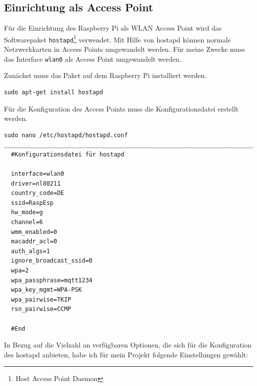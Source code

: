 \documentclass[12pt, letterpaper]{article}
\begin{document}
\subsection{Einrichtung als Access Point}
\par Für die Einrichtung des Raspberry Pi als WLAN Access Point wird das Softwarepaket \texttt{hostapd}\footnote[3]{Host Access Point Daemon} verwendet. Mit Hilfe von hostapd können normale Netzwerkkarten in Access Points umgewandelt werden. Für meine Zwecke muss das Interface \texttt{wlan0} als Access Point umgewandelt werden.
\par Zunächst muss das Paket auf dem Raspberry Pi installiert werden.
\begin{Verbatim}[frame=single]
  sudo apt-get install hostapd
\end{Verbatim}
Für die Konfiguration des Access Points muss die Konfigurationsdatei  erstellt werden. 
\begin{Verbatim}[frame=single]
  sudo nano /etc/hostapd/hostapd.conf
_____________________________________________________________________________
  #Konfigurationsdatei für hostapd
  
  interface=wlan0
  driver=nl80211
  country_code=DE
  ssid=RaspEsp
  hw_mode=g
  channel=6
  wmm_enabled=0
  macaddr_acl=0
  auth_algs=1
  ignore_broadcast_ssid=0
  wpa=2
  wpa_passphrase=mqtt1234
  wpa_key_mgmt=WPA-PSK
  wpa_pairwise=TKIP
  rsn_pairwise=CCMP

  #End
\end{Verbatim}
\par In Bezug auf die Vielzahl an verfügbaren Optionen, die sich für die Konfiguration des hostapd anbieten, habe ich für mein Projekt folgende Einstellungen gewählt: 
\end{document}
